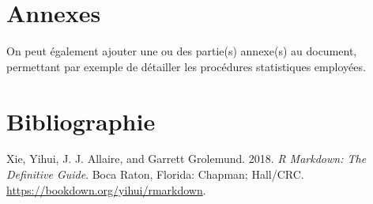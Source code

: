 \documentclass[french,]{compterendu}
\newlength{\cslhangindent}
\newenvironment{CSLReferences}%
  {\setlength{\parindent}{0pt}%
  \everypar{\setlength{\hangindent}{\cslhangindent}}\ignorespaces}%
  {\par}
\theoremstyle{definition}
\theoremstyle{definition}
\theoremstyle{definition}
\theoremstyle{definition}
\theoremstyle{remark}
\begin{document}
\hypertarget{appendix-annexes}{%
\appendix}


\hypertarget{annexes}{%
\section{Annexes}\label{annexes}}

On peut également ajouter une ou des partie(s) annexe(s) au document, permettant par exemple de détailler les procédures statistiques employées.

\hypertarget{bibliographie}{%
\section*{Bibliographie}\label{bibliographie}}

\hypertarget{refs}{}
\begin{CSLReferences}{1}{0}
\leavevmode{}%
Xie, Yihui, J. J. Allaire, and Garrett Grolemund. 2018. \emph{R Markdown: The Definitive Guide}. Boca Raton, Florida: Chapman; Hall/CRC. \url{https://bookdown.org/yihui/rmarkdown}.

\end{CSLReferences}

% 
% 
% 
% 
\end{document}
